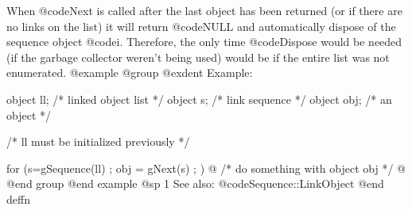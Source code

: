 When @code{Next} is called after the last object has been returned (or
if there are no links on the list) it will return @code{NULL} and
automatically dispose of the sequence object @code{i}.  Therefore,
the only time @code{Dispose} would be needed (if the garbage collector
weren't being used) would be if the entire list was not enumerated.
@example
@group
@exdent Example:

object  ll;  /*  linked object list */
object  s;   /*  link sequence      */
object  obj; /*  an object          */

/*  ll must be initialized previously  */

for (s=gSequence(ll) ; obj = gNext(s) ; )  @{
        /*  do something with object obj  */
@}
@end group
@end example
@sp 1
See also:  @code{Sequence::LinkObject}
@end deffn






